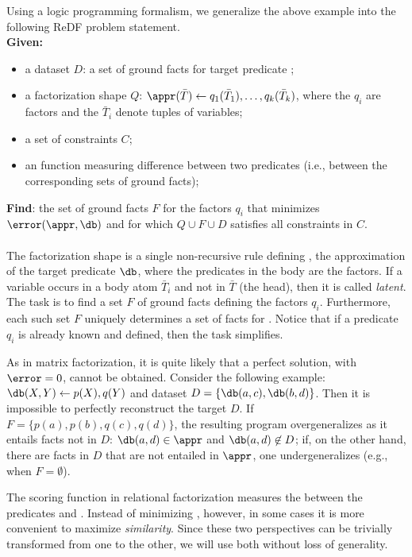Using a logic programming formalism, we generalize the above example into the following ReDF problem statement.\\
\textbf{Given:}
\begin{itemize}
  \item a dataset $D$: a set of ground facts for target predicate \db;
  \item a factorization shape $Q$: $\appr(\bar T) \leftarrow q_1(\bar T_1), \dots, q_k(\bar T_k)$, where the $q_i$ are factors and the $\bar T_i$ denote tuples of variables;
  \item a set of constraints $C$;
  \item an \error function measuring difference between two predicates (i.e., between the corresponding sets of ground facts); 
\end{itemize}
\textbf{Find}: the set of ground facts $F$ for the factors $q_i$ that minimizes $\error(\appr,\db)$ and for which $Q \cup F \cup D$ satisfies
all constraints in $C$.%
\\ 
\\
The factorization shape is a single non-recursive rule defining \appr, the 
approximation of the target predicate $\db$, where the predicates in the body are the factors. If a variable occurs in a body atom $\bar T_i$ and not in $\bar T$ (the head), then it is called \textit{latent}. The task is to find a set $F$ of ground facts defining the factors $q_i$. Furthermore, each such set $F$ uniquely determines a set of facts for \appr. 
Notice that if a predicate $q_i$ is already known and defined, then the task simplifies. 

As in matrix factorization, it is quite likely that a perfect solution, with $\error=0$, cannot be obtained. %
Consider the following example: $\db(X,Y) \leftarrow p(X), q(Y)$ and dataset $D = \{ \db(a,c), \db(b,d)\}$.
Then it is impossible to perfectly reconstruct the target $D$. If $F = \{p(a), p(b), q(c), q(d)\}$, the resulting program overgeneralizes as it entails facts not in $D$:  $\db(a,d) \in \appr$ and $\db(a,d) \not\in D$; if, on the other hand, there are facts in $D$ that are not entailed in $\appr$, one undergeneralizes (e.g., when $F = \emptyset$). 

The scoring function in relational factorization measures the \error between the 
predicates \appr and \db. Instead of minimizing \error, however, in some cases it is more convenient
to maximize {\em similarity}. Since these two perspectives can be trivially transformed from one to the other, we will use both without loss of generality. 

